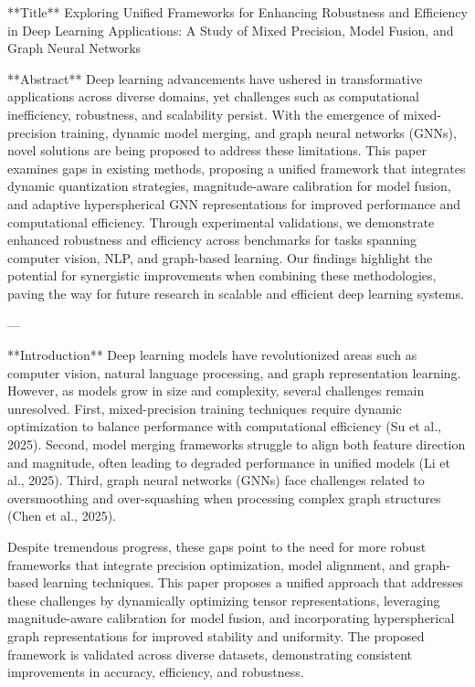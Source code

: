 **Title**  
Exploring Unified Frameworks for Enhancing Robustness and Efficiency in Deep Learning Applications: A Study of Mixed Precision, Model Fusion, and Graph Neural Networks  

**Abstract**  
Deep learning advancements have ushered in transformative applications across diverse domains, yet challenges such as computational inefficiency, robustness, and scalability persist. With the emergence of mixed-precision training, dynamic model merging, and graph neural networks (GNNs), novel solutions are being proposed to address these limitations. This paper examines gaps in existing methods, proposing a unified framework that integrates dynamic quantization strategies, magnitude-aware calibration for model fusion, and adaptive hyperspherical GNN representations for improved performance and computational efficiency. Through experimental validations, we demonstrate enhanced robustness and efficiency across benchmarks for tasks spanning computer vision, NLP, and graph-based learning. Our findings highlight the potential for synergistic improvements when combining these methodologies, paving the way for future research in scalable and efficient deep learning systems.

---

**Introduction**  
Deep learning models have revolutionized areas such as computer vision, natural language processing, and graph representation learning. However, as models grow in size and complexity, several challenges remain unresolved. First, mixed-precision training techniques require dynamic optimization to balance performance with computational efficiency (Su et al., 2025). Second, model merging frameworks struggle to align both feature direction and magnitude, often leading to degraded performance in unified models (Li et al., 2025). Third, graph neural networks (GNNs) face challenges related to oversmoothing and over-squashing when processing complex graph structures (Chen et al., 2025).  

Despite tremendous progress, these gaps point to the need for more robust frameworks that integrate precision optimization, model alignment, and graph-based learning techniques. This paper proposes a unified approach that addresses these challenges by dynamically optimizing tensor representations, leveraging magnitude-aware calibration for model fusion, and incorporating hyperspherical graph representations for improved stability and uniformity. The proposed framework is validated across diverse datasets, demonstrating consistent improvements in accuracy, efficiency, and robustness.  

